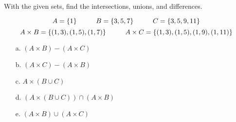 \documentclass[a4paper,12pt]{book}
\newcounter{question}
\begin{document}
        \begin{questionNOGRADE}{\thequestion}

            With the given sets, find the intersections, unions, and differences.

            $$ A = \{1\} \hspace*{1cm} B = \{3, 5, 7\} \hspace*{1cm} C = \{3, 5, 9, 11\} $$
            $$ A \times B = \{ (1, 3), (1, 5), (1, 7) \} \hspace*{1cm}{}
                A \times C = \{ (1, 3), (1, 5), (1, 9), (1, 11) \} $$

            \begin{enumerate}
                \item[a.]   $(A \times B) - (A \times C)$

                \item[b.]   $(A \times C) - (A \times B)$

                \item[c.]   $A \times (B \cup C)$

                \item[d.]   $(A \times (B \cup C)) \cap (A \times B)$

                \item[e.]   $(A \times B) \cup (A \times C)$
            \end{enumerate}

        \end{questionNOGRADE}

        \notonkey{ \newpage }{ \hrulefill }

\end{document}
